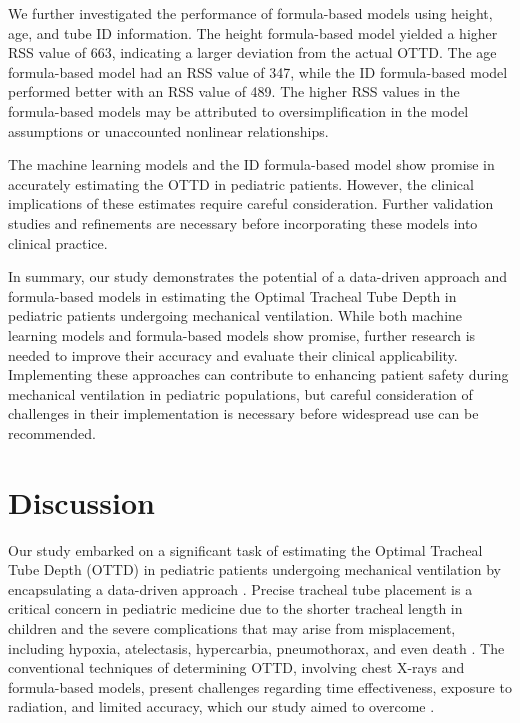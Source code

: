 \documentclass[11pt]{article}
\begin{document}
We further investigated the performance of formula-based models using height, age, and tube ID information. The height formula-based model yielded a higher RSS value of 663, indicating a larger deviation from the actual OTTD. The age formula-based model had an RSS value of 347, while the ID formula-based model performed better with an RSS value of 489. The higher RSS values in the formula-based models may be attributed to oversimplification in the model assumptions or unaccounted nonlinear relationships.

The machine learning models and the ID formula-based model show promise in accurately estimating the OTTD in pediatric patients. However, the clinical implications of these estimates require careful consideration. Further validation studies and refinements are necessary before incorporating these models into clinical practice.

In summary, our study demonstrates the potential of a data-driven approach and formula-based models in estimating the Optimal Tracheal Tube Depth in pediatric patients undergoing mechanical ventilation. While both machine learning models and formula-based models show promise, further research is needed to improve their accuracy and evaluate their clinical applicability. Implementing these approaches can contribute to enhancing patient safety during mechanical ventilation in pediatric populations, but careful consideration of challenges in their implementation is necessary before widespread use can be recommended.

\section*{Discussion}

Our study embarked on a significant task of estimating the Optimal Tracheal Tube Depth (OTTD) in pediatric patients undergoing mechanical ventilation by encapsulating a data-driven approach \cite{Wu2013RealtimeTU}. Precise tracheal tube placement is a critical concern in pediatric medicine due to the shorter tracheal length in children and the severe complications that may arise from misplacement, including hypoxia, atelectasis, hypercarbia, pneumothorax, and even death \cite{Dalens1989ComparisonOT, Loundon2010MedicalAS}. The conventional techniques of determining OTTD, involving chest X-rays and formula-based models, present challenges regarding time effectiveness, exposure to radiation, and limited accuracy, which our study aimed to overcome \cite{Thomas2017ReliabilityOU, Elfadil2022SafetyAE}. 
\end{document}
